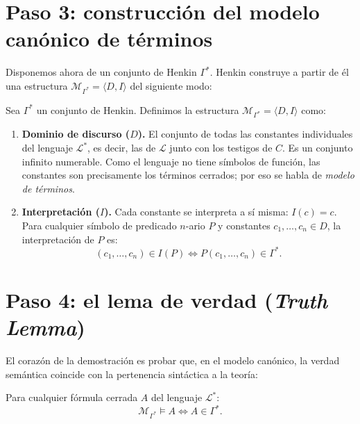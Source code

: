 \section{Paso 3: construcción del modelo canónico de términos}

Disponemos ahora de un conjunto de Henkin $\Gamma^*$. Henkin construye
a partir de él una estructura $\mathcal{M}_{\Gamma^*} = \langle D, I
\rangle$ del siguiente modo:

\begin{definition}
Sea $\Gamma^*$ un conjunto de Henkin. Definimos la estructura $\mathcal{M}_{\Gamma^*} = \langle D, I \rangle$ como:
\begin{enumerate}
    \item \textbf{Dominio de discurso ($D$).} El conjunto de todas las constantes individuales del lenguaje $\mathcal{L}^*$, es decir, las de $\mathcal{L}$ junto con los testigos de $C$. Es un conjunto infinito numerable. Como el lenguaje no tiene símbolos de función, las constantes son precisamente los términos cerrados; por eso se habla de \emph{modelo de términos}.
    \item \textbf{Interpretación ($I$).} Cada constante se interpreta a sí misma: $I(c) = c$. Para cualquier símbolo de predicado $n$-ario $P$ y constantes $c_1, \dots, c_n \in D$, la interpretación de $P$ es:
    \[
    (c_1, \dots, c_n) \in I(P) \iff P(c_1, \dots, c_n) \in \Gamma^*.
    \]
\end{enumerate}
\end{definition}

\section{Paso 4: el lema de verdad (\emph{Truth Lemma})}

El corazón de la demostración es probar que, en el modelo canónico, la verdad semántica coincide con la pertenencia sintáctica a la teoría:

\begin{lemma}\label{lema_verdad}
Para cualquier fórmula cerrada $A$ del lenguaje $\mathcal{L}^*$:
\[
\mathcal{M}_{\Gamma^*} \models A \iff A \in \Gamma^*.
\]
\end{lemma}

